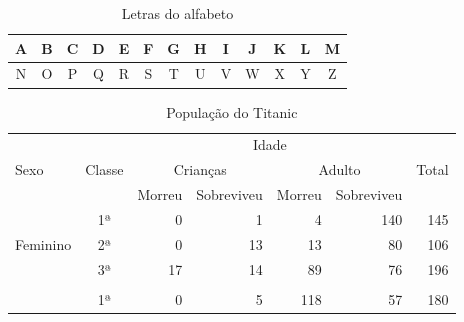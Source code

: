 \documentclass[12pt]{article}   %
\begin{document}
\begin{table}[h!]
\centering
\caption{Letras do alfabeto}
\label{tab_alfabeto}
\begin{tabular}{|c|c|c|c|c|c|c|c|c|c|c|c|c|}
\hline
A & B & C & D & E & F & G & H & I & J & K & L & M \\ \hline
N & O & P & Q & R & S & T & U & V & W & X & Y & Z \\ \hline
\end{tabular}
\end{table}

\begin{table}[h!]
\centering
\caption{População do Titanic}
\label{tab_titanic}
\begin{tabular}{lc|rrrr|r}
\hline
            & \multicolumn{1}{l|}{} & \multicolumn{4}{c|}{Idade}                                                                                                   & \multicolumn{1}{l}{}      \\ \cline{3-6}
Sexo      & Classe                & \multicolumn{2}{c|}{Crianças}                                & \multicolumn{2}{c|}{Adulto}                                   & \multicolumn{1}{c}{Total} \\ \cline{3-6}
            &                       & \multicolumn{1}{c|}{Morreu} & \multicolumn{1}{c}{Sobreviveu} & \multicolumn{1}{c|}{Morreu} & \multicolumn{1}{c|}{Sobreviveu} & \multicolumn{1}{c}{}      \\ \hline
            & 1ª                    & \multicolumn{1}{r|}{0}      & \multicolumn{1}{r|}{1}         & \multicolumn{1}{r|}{4}      & 140                             & 145                       \\
Feminino  & 2ª                    & \multicolumn{1}{r|}{0}      & \multicolumn{1}{r|}{13}        & \multicolumn{1}{r|}{13}     & 80                              & 106                       \\
            & 3ª                    & \multicolumn{1}{r|}{17}     & \multicolumn{1}{r|}{14}        & \multicolumn{1}{r|}{89}     & 76                              & 196                       \\
            &                       & \multicolumn{1}{c|}{}       & \multicolumn{1}{c|}{}          & \multicolumn{1}{c|}{}       & \multicolumn{1}{c|}{}           & \multicolumn{1}{c}{}      \\ \hline
            & 1ª                    & \multicolumn{1}{r|}{0}      & \multicolumn{1}{r|}{5}         & \multicolumn{1}{r|}{118}    & 57                              & 180                       \\

\end{tabular}
\end{table}
\end{document}
